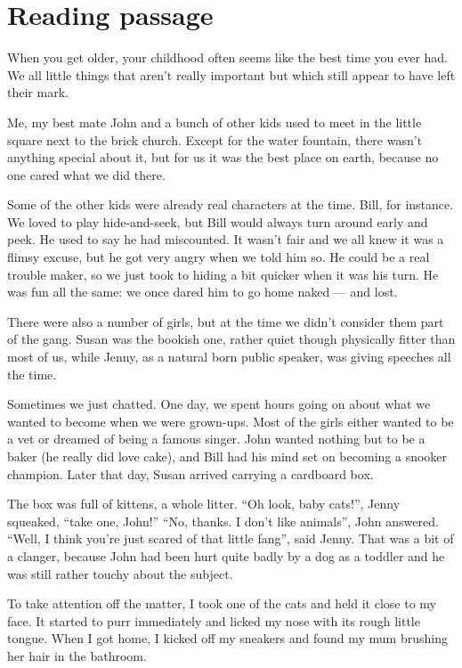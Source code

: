 \chapter{Reading passage}
\label{app.reading}
When you get older, your childhood often seems like the best time you ever had. We all  little things that aren't really important but which still appear to have left their mark.

Me, my best mate John and a bunch of other kids used to meet in the little square next to the brick church. Except for the water fountain, there wasn't anything special about it, but for us it was the best place on earth, because no one cared what we did there.

Some of the other kids were already real characters at the time. Bill, for instance. We loved to play hide-and-seek, but Bill would always turn around early and peek. He used to say he had miscounted. It wasn't fair and we all knew it was a flimsy excuse, but he got very angry when we told him so. He could be a real trouble maker, so we just took to hiding a bit quicker when it was his turn. He was fun all the same: we once dared him to go home naked --- and lost.

There were also a number of girls, but at the time we didn't consider them part of the gang. Susan was the bookish one, rather quiet though physically fitter than most of us, while Jenny, as a natural born public speaker, was giving speeches all the time.

Sometimes we just chatted. One day, we spent hours going on about what we wanted to become when we were grown-ups. Most of the girls either wanted to be a vet or dreamed of being a famous singer. John wanted nothing but to be a baker (he really did love cake), and Bill had his mind set on becoming a snooker champion.
Later that day, Susan arrived carrying a cardboard box.

The box was full of kittens, a whole litter. ``Oh look, baby cats!'', Jenny squeaked, ``take one, John!'' ``No, thanks. I don't like animals'', John answered. ``Well, I think you're just scared of that little fang'', said Jenny. That was a bit of a clanger, because John had been hurt quite badly by a dog as a toddler and he was still rather touchy about the subject.

To take attention off the matter, I took one of the cats and held it close to my face. It started to purr immediately and licked my nose with its rough little tongue.
When I got home, I kicked off my sneakers and found my mum brushing her hair in the bathroom.

